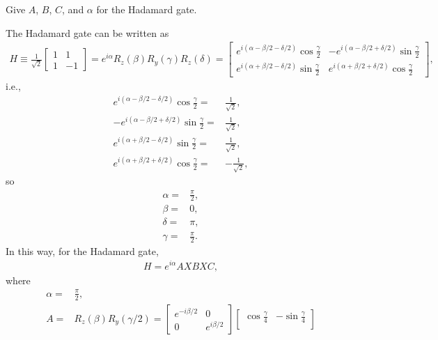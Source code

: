 \documentclass[en]{sol-man}
\begin{document}
\begin{exe}
    Give $A$, $B$, $C$, and $\alpha$ for the Hadamard gate.
\end{exe}
\begin{sol}
    The Hadamard gate can be written as
    \begin{align}
        H\equiv\frac{1}{\sqrt{2}}\begin{bmatrix}
            1&1\\
            1&-1
        \end{bmatrix}=e^{i\alpha}R_z(\beta)R_y(\gamma)R_z(\delta)=\begin{bmatrix}
            e^{i(\alpha-\beta/2-\delta/2)}\cos\frac{\gamma}{2}&-e^{i(\alpha-\beta/2+\delta/2)}\sin\frac{\gamma}{2}\\
            e^{i(\alpha+\beta/2-\delta/2)}\sin\frac{\gamma}{2}&e^{i(\alpha+\beta/2+\delta/2)}\cos\frac{\gamma}{2}
        \end{bmatrix},
    \end{align}
    i.e.,
    \begin{align}
        e^{i(\alpha-\beta/2-\delta/2)}\cos\frac{\gamma}{2}=&\frac{1}{\sqrt{2}},\\
        -e^{i(\alpha-\beta/2+\delta/2)}\sin\frac{\gamma}{2}=&\frac{1}{\sqrt{2}},\\
        e^{i(\alpha+\beta/2-\delta/2)}\sin\frac{\gamma}{2}=&\frac{1}{\sqrt{2}},\\
        e^{i(\alpha+\beta/2+\delta/2)}\cos\frac{\gamma}{2}=&-\frac{1}{\sqrt{2}},
    \end{align}
    so
    \begin{align}
        \alpha=&\frac{\pi}{2},\\
        \beta=&0,\\
        \delta=&\pi,\\
        \gamma=&\frac{\pi}{2}.
    \end{align}
    In this way, for the Hadamard gate,
    \begin{align}
        H=e^{i\alpha}AXBXC,
    \end{align}
    where
    \begin{align}
        \alpha=&\frac{\pi}{2},\\
        A=&R_z(\beta)R_y(\gamma/2)=\begin{bmatrix}
            e^{-i\beta/2}&0\\
            0&e^{i\beta/2}
        \end{bmatrix}\begin{bmatrix}
            \cos\frac{\gamma}{4}&-\sin\frac{\gamma}{4}\\

\end{bmatrix}
\end{align}
\end{sol}
\end{document}
